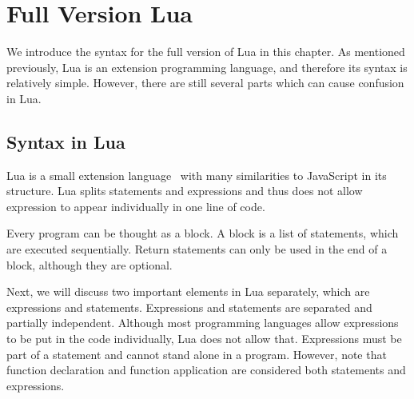 \chapter{Full Version Lua}
We introduce the syntax for the full version of Lua in this chapter. As mentioned previously, Lua is an extension programming language, and therefore its syntax is relatively simple. However, there are still several parts which can cause confusion in Lua.

\section{Syntax in Lua}
Lua is a small extension language~\cite{PIL} with many similarities to JavaScript in its structure.  Lua splits statements and expressions and thus does not allow expression to appear individually in one line of code.

Every program can be thought as a block. A block is a list of statements, which are executed sequentially. Return statements can only be used in the end of a block, although they are optional.


Next, we will discuss two important elements in Lua separately, which are expressions and statements.
Expressions and statements are separated and partially independent. Although most programming languages allow expressions to be put in the code individually, Lua does not allow that. Expressions must be part of a statement and cannot stand alone in a program.
%
However, note that function declaration and function application are considered both statements and expressions.

